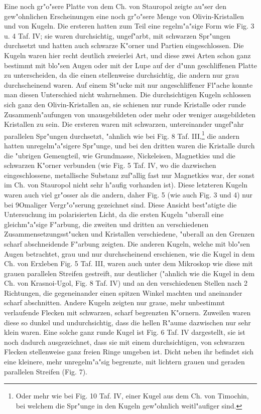 \documentclass[a4paper, 11pt, oneside, german]{article}
\begin{document}
Eine noch gr"o"sere Platte von dem Ch. von Stauropol zeigte au"ser den gew"ohnlichen Erscheinungen eine noch gr"o"sere Menge von Olivin-Kristallen und von Kugeln. Die ersteren hatten zum Teil eine regelm"a"sige Form wie Fig. 3 u. 4 Taf. IV; sie waren durchsichtig, ungef"arbt, mit schwarzen Spr"ungen durchsetzt und hatten auch schwarze K"orner und Partien eingeschlossen. Die Kugeln waren hier recht deutlich zweierlei Art, und diese zwei Arten schon ganz bestimmt mit blo"sen Augen oder mit der Lupe auf der d"unn geschliffenen Platte zu unterscheiden, da die einen stellenweise durchsichtig, die andern nur grau durchscheinend waren. Auf einem St"ucke mit nur angeschliffener Fl"ache konnte man diesen Unterschied nicht wahrnehmen. Die durchsichtigen Kugeln schlossen sich ganz den Olivin-Kristallen an, sie schienen nur runde Kristalle oder runde Zusammenh"aufungen von unausgebildeten oder mehr oder weniger ausgebildeten Kristallen zu sein. Die ersteren waren mit schwarzen, untereinander ungef"ahr parallelen Spr"ungen durchsetzt, "ahnlich wie bei Fig. 8 Taf. III,\footnote{Oder mehr wie bei Fig. 10 Taf. IV, einer Kugel aus dem Ch. von Timochin, bei welchem die Spr"unge in den Kugeln gew"ohnlich weitl"aufiger sind.} die andern hatten unregelm"a"sigere Spr"unge, und bei den dritten waren die Kristalle durch die "ubrigen Gemengteil, wie Grundmasse, Nickeleisen, Magnetkies und die schwarzen K"orner verbunden (wie Fig. 5 Taf. IV, wo die dazwischen eingeschlossene, metallische Substanz zuf"allig fast nur Magnetkies war, der sonst im Ch. von Stauropol nicht sehr h"aufig vorhanden ist). Diese letzteren Kugeln waren auch viel gr"osser als die andern, daher Fig. 5 (wie auch Fig. 3 und 4) nur bei 9Omaliger Vergr"o"serung gezeichnet sind. Diese Ansicht best"atigte die Untersuchung im polarisierten Licht, da die ersten Kugeln "uberall eine gleichm"a"sige F"arbung, die zweiten und dritten an verschiedenen Zusammensetzungsst"ucken und Kristallen verschiedene, "uberall an den Grenzen scharf abschneidende F"arbung zeigten. Die anderen Kugeln, welche mit blo"sen Augen betrachtet, grau und nur durchscheinend erschienen, wie die Kugel in dem Ch. von Erxleben Fig. 5 Taf. III, waren auch unter dem Mikroskop wie diese mit grauen parallelen Streifen gestreift, nur deutlicher ("ahnlich wie die Kugel in dem Ch. von Krasnoi-Ugol, Fig. 8 Taf. IV) und an den verschiedenen Stellen nach 2 Richtungen, die gegeneinander einen spitzen Winkel machten und aneinander scharf abschnitten. Andere Kugeln zeigten nur graue, mehr unbestimmt verlaufende Flecken mit schwarzen, scharf begrenzten K"ornern. Zuweilen waren diese so dunkel und undurchsichtig, dass die hellen R"aume dazwischen nur sehr klein waren. Eine solche ganz runde Kugel ist Fig. 6 Taf. IV dargestellt, sie ist noch dadurch ausgezeichnet, dass sie mit einem durchsichtigen, von schwarzen Flecken stellenweise ganz freien Ringe umgeben ist. Dicht neben ihr befindet sich eine kleinere, mehr unregelm"a"sig begrenzte, mit lichtern grauen und geraden parallelen Streifen (Fig. 7).
\end{document}
